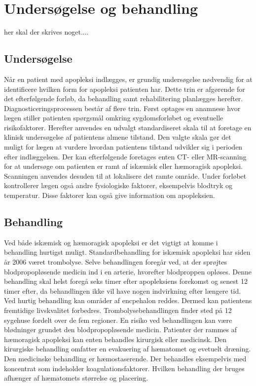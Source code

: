 \section{Undersøgelse og behandling}
her skal der skrives noget....
\subsection{Undersøgelse}
Når en patient med apopleksi indlægges, er grundig undersøgelse nødvendig for at identificere hvilken form for apopleksi patienten har. Dette trin er afgørende for det efterfølgende forløb, da behandling samt rehabilitering planlægges herefter.
Diagnosticeringsprocessen består af flere trin. Først optages en anamnese hvor lægen stiller patienten spørgsmål omkring sygdomsforløbet og eventuelle risikofaktorer. Herefter anvendes en udvalgt standardiseret skala til at foretage en klinisk undersøgelse af patientens almene tilstand. Den valgte skala gør det muligt for lægen at vurdere hvordan patientens tilstand udvikler sig i perioden efter indlæggelsen.
Der kan efterfølgende foretages enten CT- eller MR-scanning for at undersøge om patienten er ramt af iskæmisk eller hæmoragisk apopleksi. Scanningen anvendes desuden til at lokalisere det ramte område. Under forløbet kontrollerer lægen også andre fysiologiske faktorer, eksempelvis blodtryk og temperatur. Disse faktorer kan også give information om apopleksien.\cite{Sundhedsstyrelsen2009} 

\subsection{Behandling}
Ved både iskæmisk og hæmoragisk apopleksi er det vigtigt at komme i behandling hurtigst muligt. \cite{Soenderborg2013}  
Standardbehandling for iskæmisk apopleksi har siden år 2006 været trombolyse. Selve behandlingen foregår ved, at der sprøjtes blodpropopløsende medicin ind i en arterie, hvorefter blodproppen opløses. Denne behandling skal helst foregå seks timer efter apopleksiens forekomst og senest 12 timer efter, da behandlingen ikke vil have nogen indvirkning efter længere tid. Ved hurtig behandling kan områder af encpehalon reddes. Dermed kan patientens fremtidige livskvalitet forbedres. Trombolysebehandlingen finder sted på 12 sygehuse fordelt over de fem regioner. En risiko ved behandlingen kan være blødninger grundet den blodpropopløsende medicin. \cite{Hjernesagen2015b}
Patienter der rammes af hæmoragisk apopleksi kan enten behandles kirurgisk eller medicinsk. Den kirurgiske behandling omfatter en evakuering af hæmatomet og evetuelt dræning. Den medicinske behandling er hæmostaserende. Der behandles eksempelvis med koncentrat som indeholder koagulationsfaktorer. Hvilken behandling der bruges afhænger af hæmatomets størrelse og placering.  

